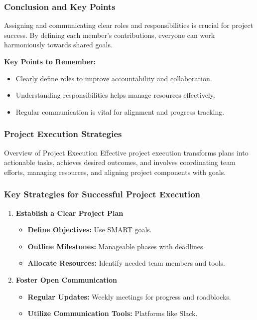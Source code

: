 \documentclass[aspectratio=169]{beamer}
\begin{document}
\begin{frame}[fragile]
    \frametitle{Conclusion and Key Points}
    Assigning and communicating clear roles and responsibilities is crucial for project success. By defining each member's contributions, everyone can work harmoniously towards shared goals.

    \textbf{Key Points to Remember:}
    \begin{itemize}
        \item Clearly define roles to improve accountability and collaboration.
        \item Understanding responsibilities helps manage resources effectively.
        \item Regular communication is vital for alignment and progress tracking.
    \end{itemize}
\end{frame}

\begin{frame}[fragile]
    \frametitle{Project Execution Strategies}
    \begin{block}{Overview of Project Execution}
        Effective project execution transforms plans into actionable tasks, achieves desired outcomes, and involves coordinating team efforts, managing resources, and aligning project components with goals.
    \end{block}
\end{frame}

\begin{frame}[fragile]
    \frametitle{Key Strategies for Successful Project Execution}
    \begin{enumerate}
        \item \textbf{Establish a Clear Project Plan}
            \begin{itemize}
                \item \textbf{Define Objectives:} Use SMART goals.
                \item \textbf{Outline Milestones:} Manageable phases with deadlines.
                \item \textbf{Allocate Resources:} Identify needed team members and tools.
            \end{itemize}
        
        \item \textbf{Foster Open Communication}
            \begin{itemize}
                \item \textbf{Regular Updates:} Weekly meetings for progress and roadblocks.
                \item \textbf{Utilize Communication Tools:} Platforms like Slack.
            \end{itemize}
    \end{enumerate}
\end{frame}
\end{document}
